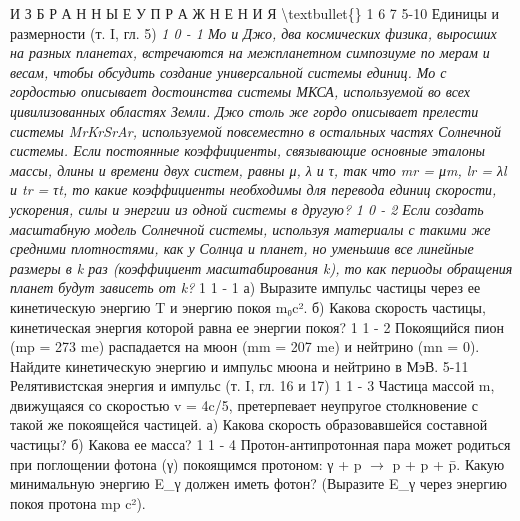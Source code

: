 \documentclass[10pt,oneside]{article}
\begin{document}
И З Б Р А Н Н Ы Е  У П Р А Ж Н Е Н И Я \textbackslash{}textbullet\{\} 1 6 7 5-10 Единицы и размерности (т. I, гл. 5) \emph{ 1 0 - 1 Мо и Джо, два космических физика, выросших на разных планетах, встречаются на межпланетном симпозиуме по мерам и весам, чтобы обсудить создание универсальной системы единиц. Мо с гордостью описывает достоинства системы МКСА, используемой во всех цивилизованных областях Земли. Джо столь же гордо описывает прелести системы MrKrSrAr, используемой повсеместно в остальных частях Солнечной системы. Если постоянные коэффициенты, связывающие основные эталоны массы, длины и времени двух систем, равны μ, λ и τ, так что mr = μm, lr = λl и tr = τt, то какие коэффициенты необходимы для перевода единиц скорости, ускорения, силы и энергии из одной системы в другую? } \emph{ 1 0 - 2 Если создать масштабную модель Солнечной системы, используя материалы с такими же средними плотностями, как у Солнца и планет, но уменьшив все линейные размеры в k раз (коэффициент масштабирования k), то как периоды обращения планет будут зависеть от k? } 1 1 - 1 а) Выразите импульс частицы через ее кинетическую энергию T и энергию покоя m₀c². б) Какова скорость частицы, кинетическая энергия которой равна ее энергии покоя? \emph{ } 1 1 - 2 Покоящийся пион (mp = 273 me) распадается на мюон (mm = 207 me) и нейтрино (mn = 0). Найдите кинетическую энергию и импульс мюона и нейтрино в МэВ. 5-11 Релятивистская энергия и импульс (т. I, гл. 16 и 17) \emph{ } 1 1 - 3 Частица массой m, движущаяся со скоростью v = 4c/5, претерпевает неупругое столкновение с такой же покоящейся частицей. а) Какова скорость образовавшейся составной частицы? б) Какова ее масса? \emph{ } 1 1 - 4 Протон-антипротонная пара может родиться при поглощении фотона (γ) покоящимся протоном: γ + p \ensuremath{\to} p + p + p̄. Какую минимальную энергию E\_γ должен иметь фотон? (Выразите E\_γ через энергию покоя протона mp c²).\par
\end{document}
